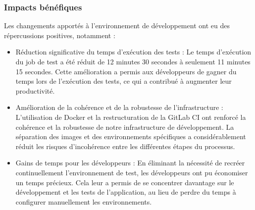 \subsubsection{Impacts bénéfiques}
Les changements apportés à l'environnement de développement ont eu des répercussions positives, notamment :
\begin{itemize}
    \item Réduction significative du temps d'exécution des tests : Le temps d'exécution du job de test a été réduit de 12 minutes 30 secondes à seulement 11 minutes 15 secondes.
    Cette amélioration a permis aux développeurs de gagner du temps lors de l'exécution des tests, ce qui a contribué à augmenter leur productivité.
    \item Amélioration de la cohérence et de la robustesse de l'infrastructure : L'utilisation de Docker et la restructuration de la GitLab CI ont renforcé la cohérence et la robustesse de notre infrastructure de développement.
    La séparation des images et des environnements spécifiques a considérablement réduit les risques d'incohérence entre les différentes étapes du processus.
    \item Gains de temps pour les développeurs : En éliminant la nécessité de recréer continuellement l'environnement de test, les développeurs ont pu économiser un temps précieux.
    Cela leur a permis de se concentrer davantage sur le développement et les tests de l'application, au lieu de perdre du temps à configurer manuellement les environnements.
\end{itemize}